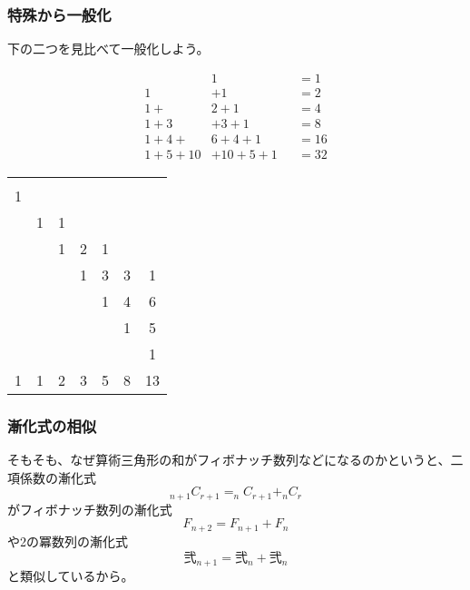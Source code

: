 \documentclass[dvipdfmx,12pt]{beamer}
\begin{document}
\begin{frame}
\frametitle{特殊から一般化}
下の二つを見比べて一般化しよう。
\begin{multicols}{2}

\begin{alignat*}{2}
&1& &=1\\
1&+1& &=2\\
1+&2+1& &=4\\
1+3&+3+1& &=8\\
1+4+&6+4+1& &=16\\
1+5+10&+10+5+1& &=32
\end{alignat*}

\begin{table}
\begin{tabular}{ccccccc}
\quad&\multicolumn{6}{c}{}\\
1&\multicolumn{6}{c}{}\\
&1&1&\multicolumn{4}{c}{}\\
&&1&2&1&&\\
&&&1&3&3&1\\
&&&&1&4&6\\
&&&&&1&5\\
&&&&&&1 \\ \hline
1&1&2&3&5&8&13
\end{tabular}
\end{table}
\end{multicols}
\end{frame}

\begin{frame}
\frametitle{漸化式の相似}
そもそも、なぜ算術三角形の和がフィボナッチ数列などになるのかというと、二項係数の漸化式$$_{n+1}C_{r+1}=_nC_{r+1}+_nC_r$$がフィボナッチ数列の漸化式$$F_{n+2}=F_{n+1}+F_n$$や2の冪数列の漸化式$$\mbox{弐}_{n+1}
=\mbox{弐}_n+\mbox{弐}_n$$と類似しているから。
\end{frame}
\end{document}

